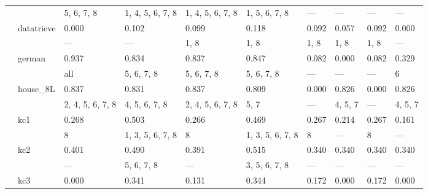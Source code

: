 \documentclass{article}
\begin{document}
\begin{center}
\begin{longtable}{p{1.2cm}p{1.8cm}p{1cm}p{1cm}p{1cm}p{1cm}p{1cm}p{1cm}p{1cm}p{1cm}}
             &              & 5, 6, 7, 8       & 1, 4, 5, 6, 7, 8 & 1, 4, 5, 6, 7, 8 & 1, 5, 6, 7, 8    & ---              & ---              & ---              & ---              \\
             & datatrieve   & 0.000            & 0.102            & 0.099            & 0.118            & 0.092            & 0.057            & 0.092            & 0.000            \\
             &              & ---              & ---              & 1, 8             & 1, 8             & 1, 8             & 1, 8             & 1, 8             & ---              \\
             & german       & 0.937            & 0.834            & 0.837            & 0.847            & 0.082            & 0.000            & 0.082            & 0.329            \\
             &              & all              & 5, 6, 7, 8       & 5, 6, 7, 8       & 5, 6, 7, 8       & ---              & ---              & ---              & 6                \\
             & house\_8L     & 0.837            & 0.831            & 0.837            & 0.809            & 0.000            & 0.826            & 0.000            & 0.826            \\
             &              & 2, 4, 5, 6, 7, 8 & 4, 5, 6, 7, 8    & 2, 4, 5, 6, 7, 8 & 5, 7             & ---              & 4, 5, 7          & ---              & 4, 5, 7          \\
             & kc1          & 0.268            & 0.503            & 0.266            & 0.469            & 0.267            & 0.214            & 0.267            & 0.161            \\
             &              & 8                & 1, 3, 5, 6, 7, 8 & 8                & 1, 3, 5, 6, 7, 8 & 8                & ---              & 8                & ---              \\
             & kc2          & 0.401            & 0.490            & 0.391            & 0.515            & 0.340            & 0.340            & 0.340            & 0.340            \\
             &              & ---              & 5, 6, 7, 8       & ---              & 3, 5, 6, 7, 8    & ---              & ---              & ---              & ---              \\
             & kc3          & 0.000            & 0.341            & 0.131            & 0.344            & 0.172            & 0.000            & 0.172            & 0.000            \\

\end{longtable}
\end{center}
\end{document}
